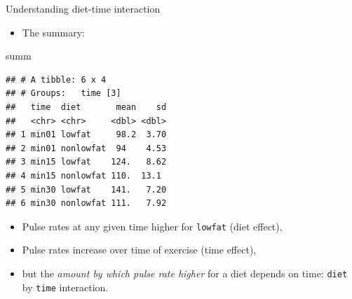 \documentclass[ignorenonframetext,]{beamer}
\newenvironment{Shaded}{\begin{snugshade}}{\end{snugshade}}
\newcommand{\NormalTok}[1]{#1}
\providecommand{\tightlist}{%
  \setlength{\itemsep}{0pt}\setlength{\parskip}{0pt}}
\begin{document}
\begin{frame}[fragile]{Understanding diet-time interaction}
\protect\hypertarget{understanding-diet-time-interaction}{}

\begin{itemize}
\tightlist
\item
  The summary:
\end{itemize}

\begin{Shaded}
\begin{Highlighting}[]
\NormalTok{summ}
\end{Highlighting}
\end{Shaded}

\begin{verbatim}
## # A tibble: 6 x 4
## # Groups:   time [3]
##   time  diet       mean    sd
##   <chr> <chr>     <dbl> <dbl>
## 1 min01 lowfat     98.2  3.70
## 2 min01 nonlowfat  94    4.53
## 3 min15 lowfat    124.   8.62
## 4 min15 nonlowfat 110.  13.1 
## 5 min30 lowfat    141.   7.20
## 6 min30 nonlowfat 111.   7.92
\end{verbatim}

\begin{itemize}
\item
  Pulse rates at any given time higher for \texttt{lowfat} (diet
  effect),
\item
  Pulse rates increase over time of exercise (time effect),
\item
  but the \emph{amount by which pulse rate higher} for a diet depends on
  time: \texttt{diet} by \texttt{time} interaction.
\end{itemize}

\end{frame}
\end{document}
